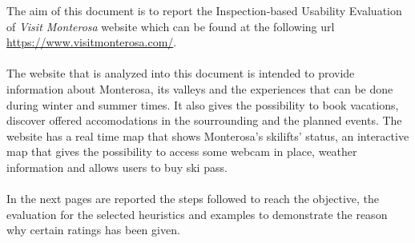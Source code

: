 The aim of this document is to report the Inspection-based Usability Evaluation of \emph{Visit Monterosa} website which can be found at the following url \url{https://www.visitmonterosa.com/}. \\ \\
The website that is analyzed into this document is intended to provide information about Monterosa, its valleys and the experiences that can be done during winter and summer times. It also gives the possibility to book vacations, discover offered accomodations in the sourrounding and the planned events. The website has a real time map that shows Monterosa's skilifts' status, an interactive map that gives the possibility to access some webcam in place, weather information and allows users to buy ski pass.\\ \\
In the next pages are reported the steps followed to reach the objective, the evaluation for the selected heuristics and examples to demonstrate the reason why certain ratings has been given.